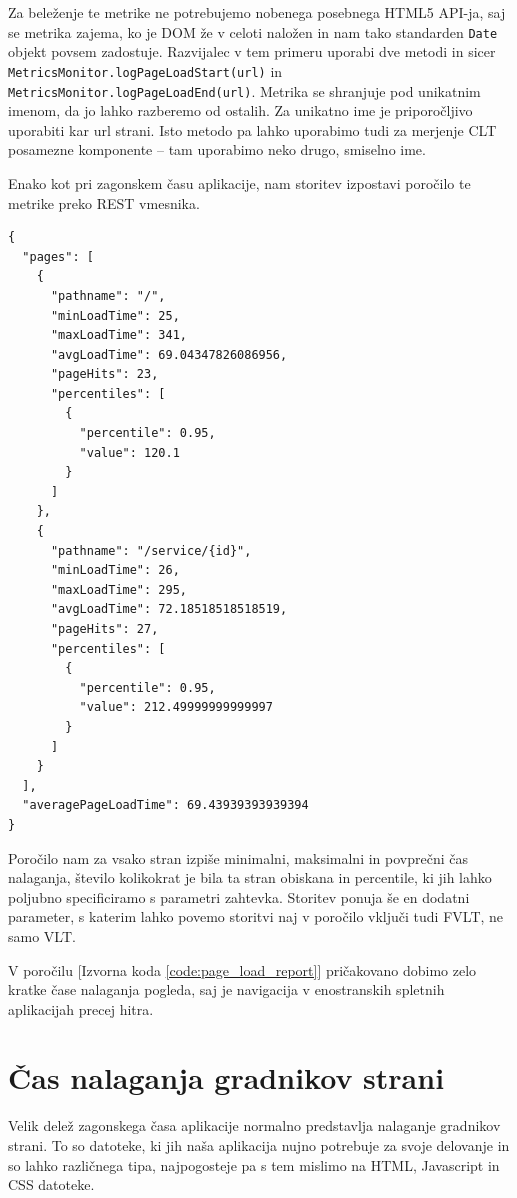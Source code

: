 \documentclass[a4paper, 12pt]{book}
\begin{document}
Za beleženje te metrike ne potrebujemo nobenega posebnega HTML5 API-ja, saj se metrika zajema, ko je DOM že v celoti naložen in nam tako standarden \verb|Date| objekt povsem zadostuje. Razvijalec v tem primeru uporabi dve metodi in sicer \verb|MetricsMonitor.logPageLoadStart(url)| in \\ \verb|MetricsMonitor.logPageLoadEnd(url)|. Metrika se shranjuje pod unikatnim imenom, da jo lahko razberemo od ostalih. Za unikatno ime je priporočljivo uporabiti kar url strani. Isto metodo pa lahko uporabimo tudi za merjenje CLT posamezne komponente – tam uporabimo neko drugo, smiselno ime.
 
Enako kot pri zagonskem času aplikacije, nam storitev izpostavi poročilo te metrike preko REST vmesnika.

\begin{lstlisting}[label=code:page_load_report, caption=Poročilo časa nalaganja pogleda]
{
  "pages": [
    {
      "pathname": "/",
      "minLoadTime": 25,
      "maxLoadTime": 341,
      "avgLoadTime": 69.04347826086956,
      "pageHits": 23,
      "percentiles": [
        {
          "percentile": 0.95,
          "value": 120.1
        }
      ]
    },
    {
      "pathname": "/service/{id}",
      "minLoadTime": 26,
      "maxLoadTime": 295,
      "avgLoadTime": 72.18518518518519,
      "pageHits": 27,
      "percentiles": [
        {
          "percentile": 0.95,
          "value": 212.49999999999997
        }
      ]
    }
  ],
  "averagePageLoadTime": 69.43939393939394
}
\end{lstlisting}

Poročilo nam za vsako stran izpiše minimalni, maksimalni in povprečni čas nalaganja, število kolikokrat je bila ta stran obiskana in percentile, ki jih lahko poljubno specificiramo s parametri zahtevka. Storitev ponuja še en dodatni parameter, s katerim lahko povemo storitvi naj v poročilo vključi tudi FVLT, ne samo VLT.

V poročilu [Izvorna koda \ref{code:page_load_report}] pričakovano dobimo zelo kratke čase nalaganja pogleda, saj je navigacija v enostranskih spletnih aplikacijah precej hitra.

\section{Čas nalaganja gradnikov strani}
\label{ch2:sec3}

Velik delež zagonskega časa aplikacije normalno predstavlja nalaganje gradnikov strani. To so datoteke, ki jih naša aplikacija nujno potrebuje za svoje delovanje in so lahko različnega tipa, najpogosteje pa s tem mislimo na HTML, Javascript in CSS datoteke.
\end{document}
